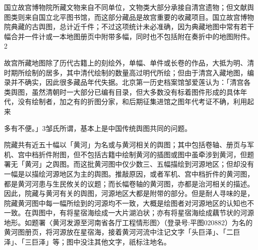 
国立故宫博物院所藏文物来自不同单位，文物类大部分承接自清宫遗物；但文献舆图类则来自国立北平图书馆，而这部分藏品是故宫重要的收藏项目。国立故宫博物院典藏的古舆图，总计近千件；不过这项统计未必准确，因为典藏地图中常有若干幅合并一件计或一本地图册页中附带多幅，同时也不包括附在奏折中的地图附件。2

故宫所藏地图除了历代古籍上的刻绘外，单幅、单件或长卷的作品，大抵为明、清时期所绘制的居多，其中清代绘制的数量高过明代所绘；但由于清宫入藏地图，编录并不确实，因此很多藏品年代失据。北京第一历史档案馆邹爱莲认为：「清宫各类舆图，虽然清朝时一大部分已编有目录，但大多数没有标着图件形成的具体年代，没有绘制者，加之有的折图分家，和后期征集进馆之图年代考证不确，利用起来

\vfill
\begin{BookNotes}
\end{BookNotes}

\noindent 多有不便。」3邹氏所谓，基本上是中国传统舆图共同的问题。

院藏共有近五十幅以「黄河」为名或与黄河相关的舆图；其中包括卷轴、册页与军机、宫中档折件附图，但不包括古籍中绘制黄河的插图或图中虽牵涉到黄河，但题署无「黄河」之舆图。而这批黄河图中仅少数三、五幅描绘到河源地区；但却没有一幅是以描绘河源地区为主的舆图。推敲原因，或者军机、宫中档折件的黄河图，都是黄河河患与生民攸关的议题；而长幅卷轴的黄河图，亦都是治河相关的描述。因此，院藏与黄河有关的舆图，河源地区大都是附带的部分。但是耐人寻味的是，院藏黄河图中每一幅所绘到的河源均不一致，大概是绘图者对河源地区的认知也不一致。在舆图中，有将星宿海绘成一大片湖泊状；亦有将星宿海绘成藕节状的河源地形。如题署〈黄河发源至河南省各厅工程情形图〉（登录号:平图020882）为名的黄河图册页，将河源放在星宿海，接着黄河河流中注记文字「头巨泽」、「二巨泽」、「三巨泽」等；图中没注其他文字，祇标注地名。

